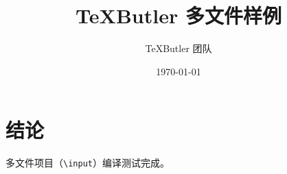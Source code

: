 \documentclass[UTF8]{ctexart}
\title{TeXButler 多文件样例}
\author{TeXButler 团队}
\date{\today}
\begin{document}
\maketitle





\section{结论}

多文件项目（\texttt{\textbackslash input}）编译测试完成。
\end{document}
